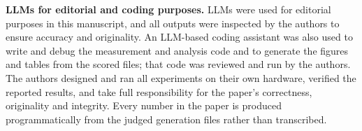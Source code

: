 \documentclass[conference,compsoc,letterpaper]{IEEEtran}
\begin{document}
\textbf{LLMs for editorial and coding purposes.} LLMs were used for editorial purposes in this manuscript, and all outputs were inspected by the authors to ensure accuracy and originality. An LLM-based coding assistant was also used to write and debug the measurement and analysis code and to generate the figures and tables from the scored files; that code was reviewed and run by the authors. The authors designed and ran all experiments on their own hardware, verified the reported results, and take full responsibility for the paper's correctness, originality and integrity. Every number in the paper is produced programmatically from the judged generation files rather than transcribed.
\end{document}
